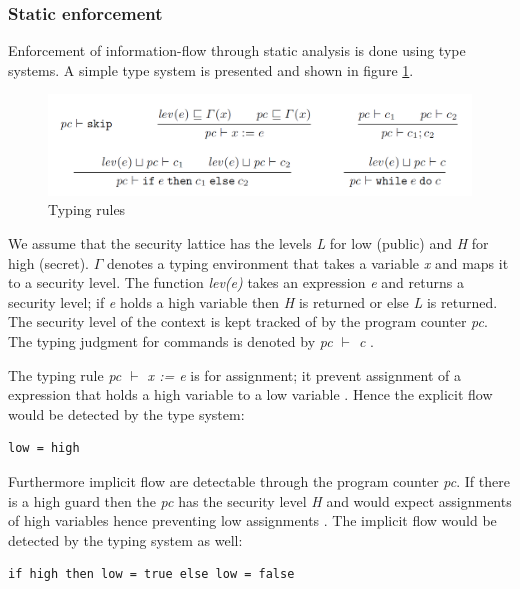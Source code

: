 \subsubsection{Static enforcement}
Enforcement of information-flow through static analysis is done using type systems.
A simple type system is presented and shown in figure \ref{fig:typesystem}. 

\begin{figure}[H]
	\centering
	\includegraphics[width=12cm]{figures/securitytypesystem.png}
	\caption{ Typing rules \cite{Sabelfeld2010}}
	\label{fig:typesystem}
\end{figure}

We assume that the security lattice has the levels \emph{L} for low (public) and \emph{H} for high (secret). $\Gamma$ denotes a typing environment that takes a variable \emph{x} and maps it to a security level. The function \emph{lev(e)} takes an expression \emph{e} and returns a security level; if \emph{e} holds a high variable then \emph{H} is returned or else \emph{L} is returned. The security level of the context is kept tracked of by the program counter \emph{pc}. The typing judgment for commands is denoted by \emph{pc $\vdash$ c} \cite{Sabelfeld2010}.

The typing rule \emph{pc $\vdash$ x := e} is for assignment; it prevent assignment of a expression that holds a high variable to a low variable \cite{Sabelfeld2010}. Hence the explicit flow would be detected by the type system:

\begin{lstlisting}
low = high
\end{lstlisting}

Furthermore implicit flow are detectable through the program counter \emph{pc}. If there is a high guard then the \emph{pc} has the security level \emph{H} and would expect assignments of high variables hence preventing low assignments \cite{Sabelfeld2010}. The implicit flow would be detected by the typing system as well:

\begin{lstlisting}
if high then low = true else low = false
\end{lstlisting}


